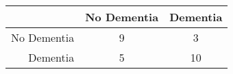 \begin{table}[ht]
\centering
\begin{tabular}{r|c|c}
  \hline
 & No Dementia & Dementia \\ 
  \hline
No Dementia & 9 & 3 \\ 
  Dementia & 5 & 10 \\ 
   \hline
\end{tabular}
\end{table}
